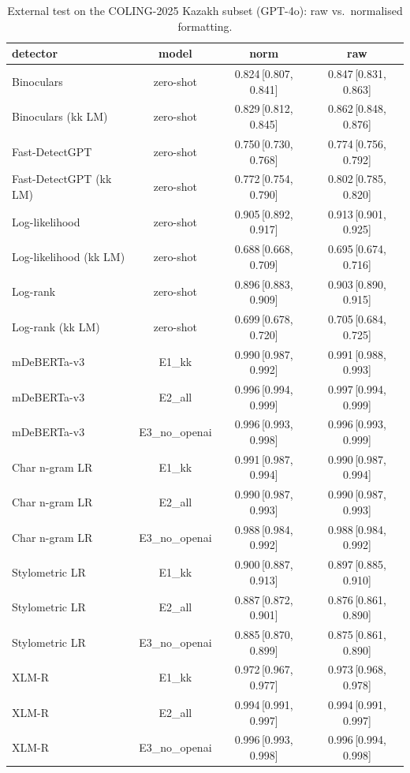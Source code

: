 \begin{table}[t]
\centering
\small
\caption{External test on the COLING-2025 Kazakh subset (GPT-4o): raw vs.\ normalised formatting.}
\label{tab:external}
\begin{tabular}{lccc}
\toprule
detector & model & norm & raw \\
\midrule
Binoculars & zero-shot & 0.824\,{\scriptsize[0.807, 0.841]} & 0.847\,{\scriptsize[0.831, 0.863]} \\
Binoculars (kk LM) & zero-shot & 0.829\,{\scriptsize[0.812, 0.845]} & 0.862\,{\scriptsize[0.848, 0.876]} \\
Fast-DetectGPT & zero-shot & 0.750\,{\scriptsize[0.730, 0.768]} & 0.774\,{\scriptsize[0.756, 0.792]} \\
Fast-DetectGPT (kk LM) & zero-shot & 0.772\,{\scriptsize[0.754, 0.790]} & 0.802\,{\scriptsize[0.785, 0.820]} \\
Log-likelihood & zero-shot & 0.905\,{\scriptsize[0.892, 0.917]} & 0.913\,{\scriptsize[0.901, 0.925]} \\
Log-likelihood (kk LM) & zero-shot & 0.688\,{\scriptsize[0.668, 0.709]} & 0.695\,{\scriptsize[0.674, 0.716]} \\
Log-rank & zero-shot & 0.896\,{\scriptsize[0.883, 0.909]} & 0.903\,{\scriptsize[0.890, 0.915]} \\
Log-rank (kk LM) & zero-shot & 0.699\,{\scriptsize[0.678, 0.720]} & 0.705\,{\scriptsize[0.684, 0.725]} \\
mDeBERTa-v3 & E1_kk & 0.990\,{\scriptsize[0.987, 0.992]} & 0.991\,{\scriptsize[0.988, 0.993]} \\
mDeBERTa-v3 & E2_all & 0.996\,{\scriptsize[0.994, 0.999]} & 0.997\,{\scriptsize[0.994, 0.999]} \\
mDeBERTa-v3 & E3_no_openai & 0.996\,{\scriptsize[0.993, 0.998]} & 0.996\,{\scriptsize[0.993, 0.999]} \\
Char n-gram LR & E1_kk & 0.991\,{\scriptsize[0.987, 0.994]} & 0.990\,{\scriptsize[0.987, 0.994]} \\
Char n-gram LR & E2_all & 0.990\,{\scriptsize[0.987, 0.993]} & 0.990\,{\scriptsize[0.987, 0.993]} \\
Char n-gram LR & E3_no_openai & 0.988\,{\scriptsize[0.984, 0.992]} & 0.988\,{\scriptsize[0.984, 0.992]} \\
Stylometric LR & E1_kk & 0.900\,{\scriptsize[0.887, 0.913]} & 0.897\,{\scriptsize[0.885, 0.910]} \\
Stylometric LR & E2_all & 0.887\,{\scriptsize[0.872, 0.901]} & 0.876\,{\scriptsize[0.861, 0.890]} \\
Stylometric LR & E3_no_openai & 0.885\,{\scriptsize[0.870, 0.899]} & 0.875\,{\scriptsize[0.861, 0.890]} \\
XLM-R & E1_kk & 0.972\,{\scriptsize[0.967, 0.977]} & 0.973\,{\scriptsize[0.968, 0.978]} \\
XLM-R & E2_all & 0.994\,{\scriptsize[0.991, 0.997]} & 0.994\,{\scriptsize[0.991, 0.997]} \\
XLM-R & E3_no_openai & 0.996\,{\scriptsize[0.993, 0.998]} & 0.996\,{\scriptsize[0.994, 0.998]} \\
\bottomrule
\end{tabular}
\end{table}